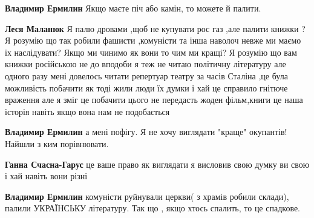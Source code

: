 \textbf{Владимир Ермилин} Якщо маєте піч або камін, то можете й палити.

 
\textbf{Леся Маланюк} Я палю дровами ,щоб не купувати рос газ ,але палити
книжки ? Я розумію що так робили фашисти ,комуністи та інша наволоч невже ми
маємо їх наслідувати? Якщо ми чинимо як вони то чим ми кращі? Я розумію що вам
книжки російською не до вподоби я теж не читаю політичну літературу але одного
разу мені довелось читати репертуар театру за часів Сталіна ,це була можливість
побачити як тоді жили люди їх думки і хай це справило гнітюче враження але я
зміг це побачити цього не передасть жоден фільм,книги це наша історія навіть
якщо вона нам не подобається

 
\textbf{Владимир Ермилин} а мені пофігу.
Я не хочу виглядати "краще" окупантів!
Найшли з ким порівнювати.

 
\textbf{Ганна Счасна-Гарус} це ваше право як виглядати я висловив свою думку ви свою і хай навіть вони різні

 
\textbf{Владимир Ермилин} комуністи руйнували церкви( з храмів робили склади), палили УКРАЇНСЬКУ літературу. Так що , якщо хтось спалить, то це спадкове.

 
